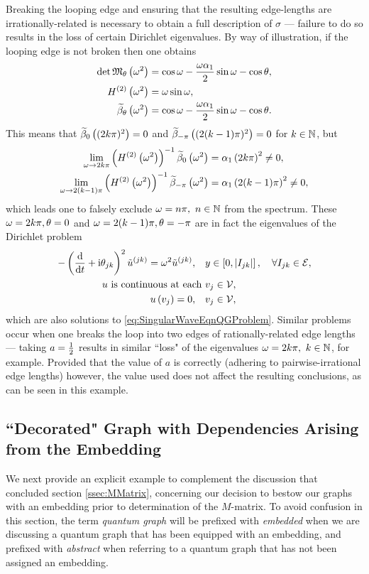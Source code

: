 Breaking the looping edge and ensuring that the resulting edge-lengths are irrationally-related is necessary to obtain a full description of $\sigma$ --- failure to do so results in the loss of certain Dirichlet eigenvalues.
By way of illustration, if the looping edge is not broken then one obtains
\begin{align*}
	\det\mathfrak{M}_{\theta}\left( \omega^2 \right) &= \cos\omega - \frac{\omega\alpha_1}{2}\sin\omega - \cos\theta, \\
	H^{(2)}\left( \omega^2 \right) &= \omega\sin\omega, \\
	\widetilde{\beta}_{\theta}\left( \omega^2 \right) &= \cos\omega - \frac{\omega\alpha_1}{2}\sin\omega - \cos\theta.
\end{align*}
This means that $\widetilde{\beta}_{0}\left( (2k\pi)^2 \right)=0$ and $\widetilde{\beta}_{-\pi}\left( (2(k-1)\pi)^2 \right)=0$ for $k\in\mathbb{N}$, but 
\begin{align*}
	\lim_{\omega\rightarrow 2k\pi}\left(  H^{(2)}\left( \omega^2 \right)  \right)^{-1}\widetilde{\beta}_{0}\left( \omega^2 \right) &= \alpha_1\left( 2k\pi \right)^2 \neq 0, \\
	\lim_{\omega\rightarrow 2(k-1)\pi}\left(  H^{(2)}\left( \omega^2 \right)  \right)^{-1}\widetilde{\beta}_{-\pi}\left( \omega^2 \right) &= \alpha_1\left( 2(k-1)\pi \right)^2 \neq 0,
\end{align*}
which leads one to falsely exclude $\omega=n\pi, \ n\in\mathbb{N}$ from the spectrum.
These $\omega=2k\pi, \theta=0$ and $\omega=2(k-1)\pi, \theta=-\pi$ are in fact the eigenvalues of the Dirichlet problem
\begin{align*}
	-\left( \dfrac{\mathrm{d}}{\mathrm{d}t} + \mathrm{i}\theta_{jk} \right)^2 \tilde{u}^{(jk)} = \omega^2 \tilde{u}^{(jk)}, \quad & y\in\left[ 0,\left\lvert I_{jk} \right\rvert \right], \quad \forall I_{jk}\in \mathcal{E}, \\
	u \text{ is continuous at each } &v_j \in \mathcal{V}, \\
	u\left( v_j \right) = 0, \quad &v_j\in\mathcal{V},
\end{align*}
which are also solutions to \eqref{eq:SingularWaveEqnQGProblem}.
Similar problems occur when one breaks the loop into two edges of rationally-related edge lengths --- taking $a=\frac{1}{2}$ results in similar ``loss" of the eigenvalues $\omega=2k\pi, \ k\in\naturals$, for example.
Provided that the value of $a$ is correctly (adhering to pairwise-irrational edge lengths) however, the value used does not affect the resulting conclusions, as can be seen in this example.

\subsection{``Decorated" Graph with Dependencies Arising from the Embedding} \label{ssec:EmbeddingDependentExample}
We next provide an explicit example to complement the discussion that concluded section \ref{ssec:MMatrix}, concerning our decision to bestow our graphs with an embedding prior to determination of the $M$-matrix. 
To avoid confusion in this section, the term \emph{quantum graph} will be prefixed with \emph{embedded} when we are discussing a quantum graph that has been equipped with an embedding, and prefixed with \emph{abstract} when referring to a quantum graph that has not been assigned an embedding.

